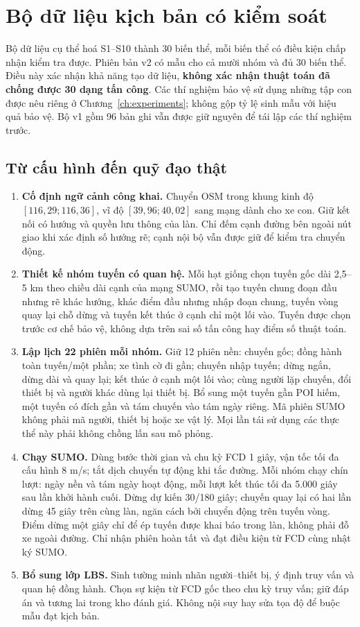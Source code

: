 \clearpage
\section{Bộ dữ liệu kịch bản có kiểm soát}
\label{sec:scenario-suite}

Bộ dữ liệu cụ thể hoá S1--S10 thành 30 biến thể, mỗi biến thể có điều kiện chấp nhận kiểm tra được. Phiên bản v2 có mẫu cho cả mười nhóm và đủ 30 biến thể. Điều này xác nhận khả năng tạo dữ liệu, \textbf{không xác nhận thuật toán đã chống được 30 dạng tấn công}. Các thí nghiệm bảo vệ sử dụng những tập con được nêu riêng ở Chương~\ref{ch:experiments}; không gộp tỷ lệ sinh mẫu với hiệu quả bảo vệ. Bộ v1 gồm 96 bản ghi vẫn được giữ nguyên để tái lập các thí nghiệm trước.

\subsection{Từ cấu hình đến quỹ đạo thật}

\begin{enumerate}
\item \textbf{Cố định ngữ cảnh công khai.} Chuyển OSM trong khung kinh độ $[116{,}29;116{,}36]$, vĩ độ $[39{,}96;40{,}02]$ sang mạng dành cho xe con. Giữ kết nối có hướng và quyền lưu thông của làn. Chỉ đếm cạnh đường bên ngoài nút giao khi xác định số hướng rẽ; cạnh nội bộ vẫn được giữ để kiểm tra chuyển động.
\item \textbf{Thiết kế nhóm tuyến có quan hệ.} Mỗi hạt giống chọn tuyến gốc dài 2,5--5 km theo chiều dài cạnh của mạng SUMO, rồi tạo tuyến chung đoạn đầu nhưng rẽ khác hướng, khác điểm đầu nhưng nhập đoạn chung, tuyến vòng quay lại chỗ dừng và tuyến kết thúc ở cạnh chỉ một lối vào. Tuyến được chọn trước cơ chế bảo vệ, không dựa trên sai số tấn công hay điểm số thuật toán.
\item \textbf{Lập lịch 22 phiên mỗi nhóm.} Giữ 12 phiên nền: chuyến gốc; đồng hành toàn tuyến/một phần; xe tình cờ đi gần; chuyến nhập tuyến; dừng ngắn, dừng dài và quay lại; kết thúc ở cạnh một lối vào; cùng người lặp chuyến, đổi thiết bị và người khác dùng lại thiết bị. Bổ sung một tuyến gần POI hiếm, một tuyến có đích gần và tám chuyến vào tám ngày riêng. Mã phiên SUMO không phải mã người, thiết bị hoặc xe vật lý. Mọi lần tái sử dụng các thực thể này phải không chồng lấn sau mô phỏng.
\item \textbf{Chạy SUMO.} Dùng bước thời gian và chu kỳ FCD 1 giây, vận tốc tối đa cấu hình 8 m/s; tắt dịch chuyển tự động khi tắc đường. Mỗi nhóm chạy chín lượt: ngày nền và tám ngày hoạt động, mỗi lượt kết thúc tối đa 5.000 giây sau lần khởi hành cuối. Dừng dự kiến 30/180 giây; chuyến quay lại có hai lần dừng 45 giây trên cùng làn, ngăn cách bởi chuyển động trên tuyến vòng. Điểm dừng một giây chỉ để ép tuyến được khai báo trong làn, không phải đỗ xe ngoài đường. Chỉ nhận phiên hoàn tất và đạt điều kiện từ FCD cùng nhật ký SUMO.
\item \textbf{Bổ sung lớp LBS.} Sinh tường minh nhãn người--thiết bị, ý định truy vấn và quan hệ đồng hành. Chọn sự kiện từ FCD gốc theo chu kỳ truy vấn; giữ đáp án và tương lai trong kho đánh giá. Không nội suy hay sửa tọa độ để buộc mẫu đạt kịch bản.
\end{enumerate}

